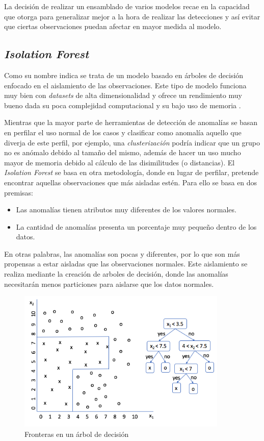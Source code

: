 La decisión de realizar un ensamblado de varios modelos recae en la capacidad que otorga para generalizar mejor a la hora de realizar las detecciones y así evitar que ciertas observaciones puedan afectar en mayor medida al modelo.

\subsection{\textit{Isolation Forest}}

Como su nombre indica se trata de un modelo basado en árboles de decisión enfocado en el aislamiento de las observaciones. Este tipo de modelo funciona muy bien con \textit{datasets} de alta dimensionalidad y ofrece un rendimiento muy bueno dada su poca complejidad computacional y su bajo uso de memoria \cite{liu2008isolation}.

Mientras que la mayor parte de herramientas de detección de anomalías se basan en perfilar el uso normal de los casos y clasificar como anomalía aquello que diverja de este perfil, por ejemplo, una \textit{clusterización} podría indicar que un grupo no es anómalo debido al tamaño del mismo, además de hacer un uso mucho mayor de memoria debido al cálculo de las disimilitudes (o distancias). El \textit{Isolation Forest} se basa en otra metodología, donde en lugar de perfilar, pretende encontrar aquellas observaciones que más aisladas estén. Para ello se basa en dos premisas:
\begin{itemize}
    \item Las anomalías tienen atributos muy diferentes de los valores normales.
    \item La cantidad de anomalías presenta un porcentaje muy pequeño dentro de los datos.
\end{itemize}

En otras palabras, las anomalías son pocas y diferentes, por lo que son más propensas a estar aisladas que las observaciones normales. Este aislamiento se realiza mediante la creación de arboles de decisión, donde las anomalías necesitarán menos particiones para aislarse que los datos normales.

\begin{figure}[h]
    \centering
    \includegraphics[width=10cm]{figs/tree.png}
    \caption{Fronteras en un árbol de decisión}
    \label{fig:tree_boundaries}
\end{figure}

